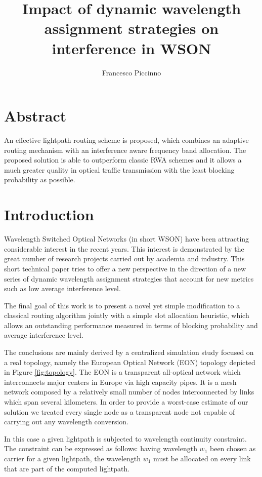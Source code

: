 \documentclass[9pt,twocolumn]{article}
\title{\textbf{Impact of dynamic wavelength assignment strategies on interference in WSON}}
\author{Francesco Piccinno}
\date{}
\begin{document}
\maketitle

\section*{Abstract} An effective lightpath routing scheme is proposed, which combines an adaptive routing mechanism \cite{art} with an interference aware frequency band allocation. The proposed solution is able to outperform classic RWA schemes and it allows a much greater quality in optical traffic transmission with the least blocking probability as possible.


\section{Introduction}

Wavelength Switched Optical Networks (in short WSON) have been attracting considerable interest in the recent years. This interest is demonstrated by the great number of research projects carried out by academia and industry. This short technical paper tries to offer a new perspective in the direction of a new series of dynamic wavelength assignment strategies that account for new metrics such as low average interference level.

The final goal of this work is to present a novel yet simple modification to a classical routing algorithm jointly with a simple slot allocation heuristic, which allows an outstanding performance measured in terms of blocking probability and average interference level.

The conclusions are mainly derived by a centralized simulation study focused on a real topology, namely the European Optical Network (EON) topology depicted in Figure \ref{fig:topology}. The EON is a transparent all-optical network which interconnects major centers in Europe via high capacity pipes. It is a mesh network composed by a relatively small number of nodes interconnected by links which span several kilometers. In order to provide a worst-case estimate of our solution we treated every single node as a transparent node not capable of carrying out any wavelength conversion.

In this case a given lightpath is subjected to wavelength continuity constraint. The constraint can be expressed as follows: having wavelength $w_1$ been chosen as carrier for a given lightpath, the wavelength $w_1$ must be allocated on every link that are part of the computed lightpath.
\end{document}
